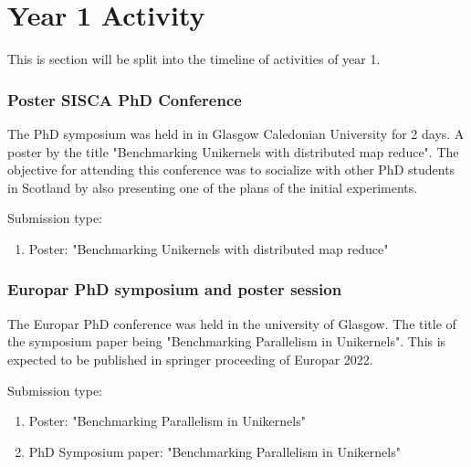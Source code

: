 
\chapter{Year 1 Activity}  %
This is section will be split into the timeline of activities of year 1.

\subsection{Poster SISCA PhD Conference}
The PhD symposium was held in in Glasgow Caledonian University for 2 days. A poster 
by the title "Benchmarking Unikernels with distributed map reduce"\cite{Sisca2022Poster}. The
objective for attending this conference was to socialize with other PhD students 
in Scotland by also presenting one of the plans of the initial experiments. 

Submission type:
\begin{enumerate}
    \item Poster: "Benchmarking Unikernels with distributed map reduce"\cite{Sisca2022Poster}
\end{enumerate}

\subsection{Europar PhD symposium and poster session}
The Europar PhD conference was held in the university of Glasgow. The title 
of the symposium paper being "Benchmarking Parallelism in Unikernels"\cite{Europar2022Paper}. This 
is expected to be published in springer proceeding of Europar 2022. 

Submission type:
\begin{enumerate}
    \item Poster: "Benchmarking Parallelism in Unikernels"\cite{Europar2022Poster}
    \item PhD Symposium paper: "Benchmarking Parallelism in Unikernels"\cite{Europar2022Paper}
\end{enumerate}